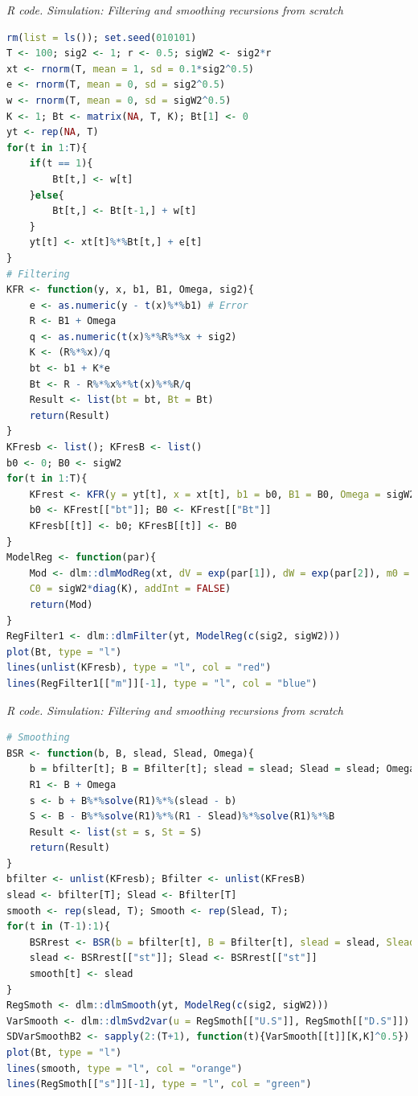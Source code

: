 \begin{enumerate}[leftmargin=*]
\begin{tcolorbox}[enhanced,width=4.67in,center upper,
	fontupper=\large\bfseries,drop shadow southwest,sharp corners]
	\textit{R code. Simulation: Filtering and smoothing recursions from scratch}
	\begin{VF}
		\begin{lstlisting}[language=R]
rm(list = ls()); set.seed(010101)
T <- 100; sig2 <- 1; r <- 0.5; sigW2 <- sig2*r
xt <- rnorm(T, mean = 1, sd = 0.1*sig2^0.5) 
e <- rnorm(T, mean = 0, sd = sig2^0.5)
w <- rnorm(T, mean = 0, sd = sigW2^0.5)
K <- 1; Bt <- matrix(NA, T, K); Bt[1] <- 0
yt <- rep(NA, T)
for(t in 1:T){
	if(t == 1){
		Bt[t,] <- w[t]
	}else{
		Bt[t,] <- Bt[t-1,] + w[t]
	}
	yt[t] <- xt[t]%*%Bt[t,] + e[t]
}
# Filtering
KFR <- function(y, x, b1, B1, Omega, sig2){
	e <- as.numeric(y - t(x)%*%b1) # Error
	R <- B1 + Omega
	q <- as.numeric(t(x)%*%R%*%x + sig2)
	K <- (R%*%x)/q
	bt <- b1 + K*e
	Bt <- R - R%*%x%*%t(x)%*%R/q
	Result <- list(bt = bt, Bt = Bt) 
	return(Result)
}
KFresb <- list(); KFresB <- list()
b0 <- 0; B0 <- sigW2
for(t in 1:T){
	KFrest <- KFR(y = yt[t], x = xt[t], b1 = b0, B1 = B0, Omega = sigW2, sig2 = sig2)
	b0 <- KFrest[["bt"]]; B0 <- KFrest[["Bt"]]
	KFresb[[t]] <- b0; KFresB[[t]] <- B0 
}
ModelReg <- function(par){
	Mod <- dlm::dlmModReg(xt, dV = exp(par[1]), dW = exp(par[2]), m0 = rep(0, K),
	C0 = sigW2*diag(K), addInt = FALSE)
	return(Mod)
}
RegFilter1 <- dlm::dlmFilter(yt, ModelReg(c(sig2, sigW2)))
plot(Bt, type = "l")
lines(unlist(KFresb), type = "l", col = "red")
lines(RegFilter1[["m"]][-1], type = "l", col = "blue")
\end{lstlisting}
	\end{VF}
\end{tcolorbox}

\begin{tcolorbox}[enhanced,width=4.67in,center upper,
	fontupper=\large\bfseries,drop shadow southwest,sharp corners]
	\textit{R code. Simulation: Filtering and smoothing recursions from scratch}
	\begin{VF}
		\begin{lstlisting}[language=R]
# Smoothing 
BSR <- function(b, B, slead, Slead, Omega){
	b = bfilter[t]; B = Bfilter[t]; slead = slead; Slead = slead; Omega = sigW2
	R1 <- B + Omega
	s <- b + B%*%solve(R1)%*%(slead - b)
	S <- B - B%*%solve(R1)%*%(R1 - Slead)%*%solve(R1)%*%B
	Result <- list(st = s, St = S) 
	return(Result)
}
bfilter <- unlist(KFresb); Bfilter <- unlist(KFresB)
slead <- bfilter[T]; Slead <- Bfilter[T]
smooth <- rep(slead, T); Smooth <- rep(Slead, T);  
for(t in (T-1):1){
	BSRrest <- BSR(b = bfilter[t], B = Bfilter[t], slead = slead, Slead = Slead, Omega = sigW2)
	slead <- BSRrest[["st"]]; Slead <- BSRrest[["st"]]
	smooth[t] <- slead
}
RegSmoth <- dlm::dlmSmooth(yt, ModelReg(c(sig2, sigW2)))
VarSmooth <- dlm::dlmSvd2var(u = RegSmoth[["U.S"]], RegSmoth[["D.S"]])
SDVarSmoothB2 <- sapply(2:(T+1), function(t){VarSmooth[[t]][K,K]^0.5}) 
plot(Bt, type = "l")
lines(smooth, type = "l", col = "orange")
lines(RegSmoth[["s"]][-1], type = "l", col = "green")
\end{lstlisting}
	\end{VF}
\end{tcolorbox}



\end{enumerate}
